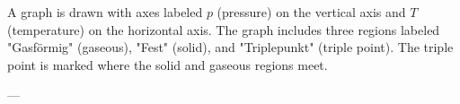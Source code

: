 A graph is drawn with axes labeled \( p \) (pressure) on the vertical axis and \( T \) (temperature) on the horizontal axis. The graph includes three regions labeled "Gasförmig" (gaseous), "Fest" (solid), and "Triplepunkt" (triple point). The triple point is marked where the solid and gaseous regions meet.

---